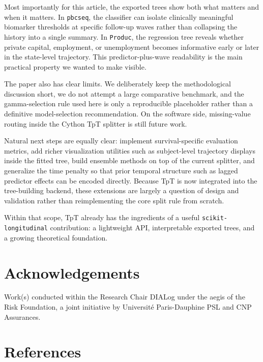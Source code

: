 \documentclass[
]{article}
\begin{document}
Most importantly for this article, the exported trees show both what
matters and when it matters. In \texttt{pbcseq}, the classifier can
isolate clinically meaningful biomarker thresholds at specific follow-up
waves rather than collapsing the history into a single summary. In
\texttt{Produc}, the regression tree reveals whether private capital,
employment, or unemployment becomes informative early or later in the
state-level trajectory. This predictor-plus-wave readability is the main
practical property we wanted to make visible.

The paper also has clear limits. We deliberately keep the methodological
discussion short, we do not attempt a large comparative benchmark, and
the gamma-selection rule used here is only a reproducible placeholder
rather than a definitive model-selection recommendation. On the software
side, missing-value routing inside the Cython TpT splitter is still
future work.

Natural next steps are equally clear: implement survival-specific
evaluation metrics, add richer visualization utilities such as
subject-level trajectory displays inside the fitted tree, build ensemble
methods on top of the current splitter, and generalize the time penalty
so that prior temporal structure such as lagged predictor effects can be
encoded directly. Because TpT is now integrated into the tree-building
backend, these extensions are largely a question of design and
validation rather than reimplementing the core split rule from scratch.

Within that scope, TpT already has the ingredients of a useful
\texttt{scikit-longitudinal} contribution: a lightweight API,
interpretable exported trees, and a growing theoretical foundation.

\section{Acknowledgements}\label{acknowledgements}

Work(s) conducted within the Research Chair DIALog under the aegis of
the Risk Foundation, a joint initiative by Université Paris-Dauphine PSL
and CNP Assurances.

\section*{References}\label{references}
\end{document}
